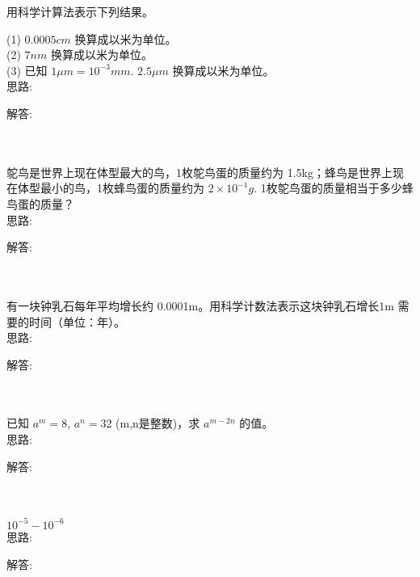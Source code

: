 \item {
    用科学计算法表示下列结果。
    
    (1) $ 0.0005 cm$ 换算成以米为单位。\\
    (2) $ 7 nm $ 换算成以米为单位。\\
    (3) 已知 $1 \mu m = 10^{-3}mm$. $ 2.5 \mu m$ 换算成以米为单位。
    \ifshowSolution
        \fangsong{}
        \\
        思路:

        解答: 
    \else
        \\ \\ \\
    \fi
}

\item {
    鸵鸟是世界上现在体型最大的鸟，1枚鸵鸟蛋的质量约为 1.5kg；蜂鸟是世界上现在体型最小的鸟，1枚蜂鸟蛋的质量约为 $2\times 10^{-1}g$. 1枚鸵鸟蛋的质量相当于多少蜂鸟蛋的质量？
    \ifshowSolution
        \fangsong{}
        \\
        思路:

        解答: 
    \else
        \\ \\ \\
    \fi
}

\item {
    有一块钟乳石每年平均增长约 0.0001m。用科学计数法表示这块钟乳石增长1m 需要的时间（单位：年）。
    \ifshowSolution
        \fangsong{}
        \\
        思路:

        解答: 
    \else
        \\ \\ \\
    \fi
}

\item {
    已知 $a^m = 8$, $a^n = 32$ (m,n是整数)，求 $a^{m-2n}$ 的值。
    \ifshowSolution
        \fangsong{}
        \\
        思路:

        解答: 
    \else
        \\ \\ \\
    \fi
}

\item {
    $ 10^{-5} - 10^{-6} $
    \ifshowSolution
        \fangsong{}
        \\
        思路:

        解答: 
    \else
        \\ \\ \\
    \fi
}

